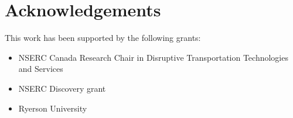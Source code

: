 \thispagestyle{plain}
\section*{Acknowledgements}

\begin{flushleft}
This work has been supported by the following grants:
\begin{itemize}
    \item NSERC Canada Research Chair in Disruptive Transportation Technologies and Services
    \item NSERC Discovery grant
    \item Ryerson University
\end{itemize}
\end{flushleft}
